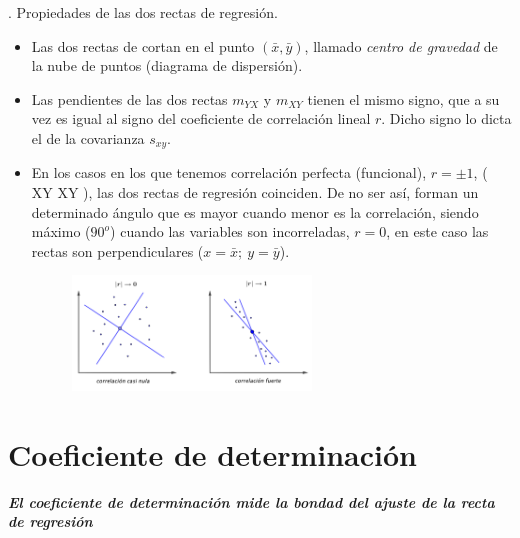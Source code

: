\begin{theorem}
.	Propiedades de las dos rectas de regresión.

\begin{itemize}

\item Las dos rectas de cortan en el punto $(\bar x, \bar y)$, llamado \emph{centro de gravedad} de la nube de puntos (diagrama de dispersión).

\item Las pendientes de las dos rectas $m_{YX}$ y $m_{XY}$ tienen el mismo signo, que a su vez es igual al signo del coeficiente de correlación lineal $r$. Dicho signo lo dicta el de la covarianza $s_{xy}$.

\item En los casos en los que tenemos correlación perfecta (funcional), $r=\pm 1$, ( XY XY ), las dos rectas de regresión coinciden. De no ser así, forman un determinado ángulo que es mayor cuando menor es la correlación, siendo máximo ($90^o$) cuando las variables son incorreladas, $r=0$, en este caso las rectas son perpendiculares ($x=\bar x;\ y=\bar y$).

	\begin{figure}[H]
			\centering
			\includegraphics[width=0.6\textwidth]{imagenes/imagenes03/T03IM09.png}
	\end{figure}
\end{itemize}
\end{theorem}

\section{Coeficiente de determinación}

\textbf{\emph{El coeficiente de determinación mide la bondad del ajuste de la recta de regresión}}

